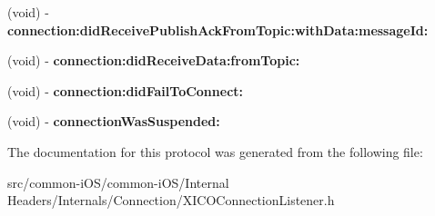 \begin{DoxyCompactItemize}
\hypertarget{protocol_x_i_c_o_connection_listener_01-p_aa4dcc52641040f6efce0ce141ed326a0}{}\label{protocol_x_i_c_o_connection_listener_01-p_aa4dcc52641040f6efce0ce141ed326a0} 
(void) -\/ {\bfseries connection\+:did\+Receive\+Publish\+Ack\+From\+Topic\+:with\+Data\+:message\+Id\+:}
\item 
\hypertarget{protocol_x_i_c_o_connection_listener_01-p_aeec9e995021f0964814ac37d233b56bb}{}\label{protocol_x_i_c_o_connection_listener_01-p_aeec9e995021f0964814ac37d233b56bb} 
(void) -\/ {\bfseries connection\+:did\+Receive\+Data\+:from\+Topic\+:}
\item 
\hypertarget{protocol_x_i_c_o_connection_listener_01-p_a2c178a0979ff3075a5e401a29c15793c}{}\label{protocol_x_i_c_o_connection_listener_01-p_a2c178a0979ff3075a5e401a29c15793c} 
(void) -\/ {\bfseries connection\+:did\+Fail\+To\+Connect\+:}
\item 
\hypertarget{protocol_x_i_c_o_connection_listener_01-p_a5148fefa0a81657f5f6e3116ba825af4}{}\label{protocol_x_i_c_o_connection_listener_01-p_a5148fefa0a81657f5f6e3116ba825af4} 
(void) -\/ {\bfseries connection\+Was\+Suspended\+:}
\end{DoxyCompactItemize}


The documentation for this protocol was generated from the following file\+:\begin{DoxyCompactItemize}
\item 
src/common-\/i\+O\+S/common-\/i\+O\+S/\+Internal Headers/\+Internals/\+Connection/X\+I\+C\+O\+Connection\+Listener.\+h\end{DoxyCompactItemize}
